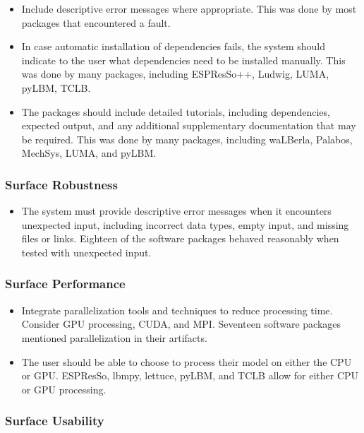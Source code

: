 \documentclass[final, 3p, times, authoryear]{elsarticle}
\begin{document}
\begin{itemize}
	\item Include descriptive error messages where appropriate. This was done by most packages that encountered a fault.
	\item In case automatic installation of dependencies fails, the system should indicate to the user what dependencies need to be installed manually. This was done by many packages, including ESPResSo++, Ludwig, LUMA, pyLBM, TCLB.
	\item The packages should include detailed tutorials, including dependencies, expected output, and any additional supplementary documentation that may be required. This was done by many packages, including waLBerla, Palabos, MechSys, LUMA, and pyLBM.
\end{itemize}

\subsubsection{Surface Robustness}

\begin{itemize}
	\item The system must provide descriptive error messages when it encounters unexpected input, including incorrect data types, empty input, and missing files or links. Eighteen of the software packages behaved reasonably when tested with unexpected input.
\end{itemize}

\subsubsection{Surface Performance}

\begin{itemize}
	\item Integrate parallelization tools and techniques to reduce processing time. Consider GPU processing, CUDA, and MPI. Seventeen software packages mentioned parallelization in their artifacts.
	\item The user should be able to choose to process their model on either the CPU or GPU. ESPResSo, lbmpy, lettuce, pyLBM, and TCLB allow for either CPU or GPU processing.
\end{itemize}

\subsubsection{Surface Usability}
\end{document}
